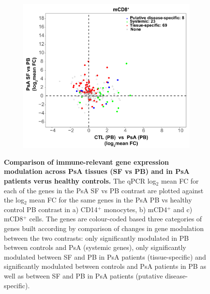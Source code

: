\begin{figure}[htbp]
\begin{subfigure}{0.45\textwidth}
\caption{\textbf{}}
\end{subfigure} %
\begin{subfigure}{0.45\textwidth}
\centering
\includegraphics[width=\textwidth]{./Results3/pdfs/PSA_array_correlation_CD8_FC_HVPsA_vs_SFPBPsA}
\caption{\textbf{}}
\end{subfigure}
\caption[Comparison of immune-relevant gene expression modulation across PsA tissues (SF vs PB) and in PsA patients verus healthy controls.]{\textbf{Comparison of immune-relevant gene expression modulation across PsA tissues (SF vs PB) and in PsA patients verus healthy controls.} The qPCR log${_2}$ mean FC for each of the genes in the PsA SF vs PB contrast are plotted against the log${_2}$ mean FC for the same genes in the PsA PB vs healthy control PB contrast in a) CD14$^+$ monocytes, b) mCD4$^+$ and c) mCD8$^+$ cells. The genes are colour-coded based three categories of genes built according by comparison of changes in gene modulation between the two contrasts: only significantly modulated in PB between controls and PsA (systemic genes), only significantly modulated between SF and PB in PsA patients (tissue-specific) and significantly modulated between controls and PsA patients in PB as well as between SF and PB in PsA patients (putative disease-specific).}
\label{figure:PSA_PCR_array_HC_FC_correlation}
\end{figure} 



